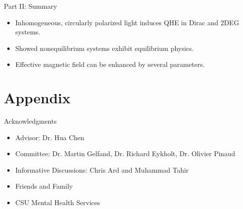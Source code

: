 \documentclass[xcolor=dvipsnames,10pt,aspectratio=169]{beamer}
\newcommand{\CO}{Summary}
\begin{document}
  \begin{frame}{Part II: \CO}
    \begin{itemize}
      \item Inhomogeneous, circularly polarized light induces QHE in Dirac and 2DEG systems.
      \item Showed nonequilibrium systems exhibit equilibrium physics.
      \item Effective magnetic field can be enhanced by several parameters.
    \end{itemize}

  \end{frame}

  \appendix
  \section{Appendix}

  \begin{frame}{Acknowledgments}
    \centering
    \vspace{2em}
    \begin{itemize}
      \small
      \item Advisor: Dr. Hua Chen
      \item Committee: Dr. Martin Gelfand, Dr. Richard Eykholt, Dr. Olivier Pinaud
      \item Informative Discussions: Chris Ard and Muhammad Tahir
      \item Friends and Family
      \item CSU Mental Health Services
    \end{itemize}
  \end{frame}
\end{document}
